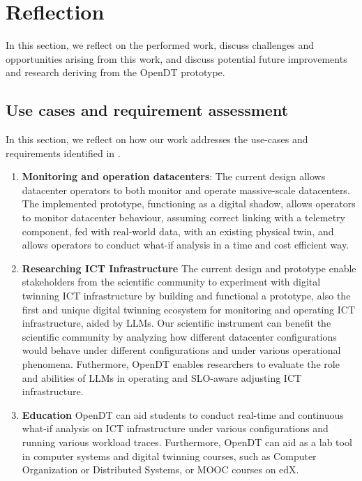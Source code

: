 \section{Reflection}\label{sec:reflection}

In this section, we reflect on the performed work, discuss challenges and opportunities arising from this work, and discuss potential future improvements and research deriving from the OpenDT prototype. 

\subsection{Use cases and requirement assessment}\label{sec:reflection:use-case-requirements}
In this section, we reflect on how our work addresses the use-cases and requirements identified in .

\begin{enumerate}
[label=\textbf{(UC\arabic*)},leftmargin=0pt,itemindent=3em]
    \item \label{design:uc1} \textbf{Monitoring and operation datacenters}: The current design allows datacenter operators to both monitor and operate massive-scale datacenters. The implemented prototype, functioning as a digital shadow, allows operators to monitor datacenter behaviour, assuming correct linking with a telemetry component, fed with real-world data, with an existing physical twin, and allows operators to conduct what-if analysis in a time and cost efficient way.
    \item \label{design:uc2} \textbf{Researching ICT Infrastructure} The current design and prototype enable stakeholders from the scientific community to experiment with digital twinning ICT infrastructure by building and functional a prototype, also the first and unique digital twinning ecosystem for monitoring and operating ICT infrastructure, aided by LLMs. Our scientific instrument can benefit the scientific community by analyzing how different datacenter configurations would behave under different configurations and under various operational phenomena. Futhermore, OpenDT enables researchers to evaluate the role and abilities of LLMs in operating and SLO-aware adjusting ICT infrastructure.
    \item \label{design:uc3} \textbf{Education} OpenDT can aid students to conduct real-time and continuous what-if analysis on ICT infrastructure under various configurations and running various workload traces. Furthermore, OpenDT can aid as a lab tool in computer systems and digital twinning courses, such as Computer Organization or Distributed Systems, or MOOC courses on edX.
\end{enumerate}


